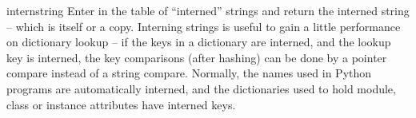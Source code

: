 \begin{funcdesc}{intern}{string}
  Enter  in the table of ``interned'' strings and return
  the interned string -- which is  itself or a copy.
  Interning strings is useful to gain a little performance on
  dictionary lookup -- if the keys in a dictionary are interned, and
  the lookup key is interned, the key comparisons (after hashing) can
  be done by a pointer compare instead of a string compare.  Normally,
  the names used in Python programs are automatically interned, and
  the dictionaries used to hold module, class or instance attributes
  have interned keys.  
\end{funcdesc}
